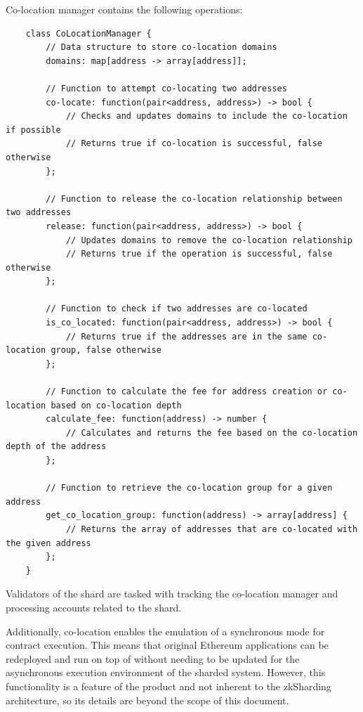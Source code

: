 Co-location manager contains the following operations:
\begin{verbatim}
    class CoLocationManager {
        // Data structure to store co-location domains
        domains: map[address -> array[address]];

        // Function to attempt co-locating two addresses
        co-locate: function(pair<address, address>) -> bool {
            // Checks and updates domains to include the co-location if possible
            // Returns true if co-location is successful, false otherwise
        };

        // Function to release the co-location relationship between two addresses
        release: function(pair<address, address>) -> bool {
            // Updates domains to remove the co-location relationship
            // Returns true if the operation is successful, false otherwise
        };

        // Function to check if two addresses are co-located
        is_co_located: function(pair<address, address>) -> bool {
            // Returns true if the addresses are in the same co-location group, false otherwise
        };

        // Function to calculate the fee for address creation or co-location based on co-location depth
        calculate_fee: function(address) -> number {
            // Calculates and returns the fee based on the co-location depth of the address
        };

        // Function to retrieve the co-location group for a given address
        get_co_location_group: function(address) -> array[address] {
            // Returns the array of addresses that are co-located with the given address
        };
    }
\end{verbatim}

Validators of the shard are tasked with tracking the co-location manager
and processing accounts related to the shard.

Additionally, co-location enables the emulation of a synchronous mode for contract execution.
This means that original Ethereum applications can be redeployed 
 and run on top of \nil without needing to be updated 
 for the asynchronous execution environment of the sharded system.
However, this functionality is a feature of the \nil product 
 and not inherent to the zkSharding architecture,
 so its details are beyond the scope of this document.


